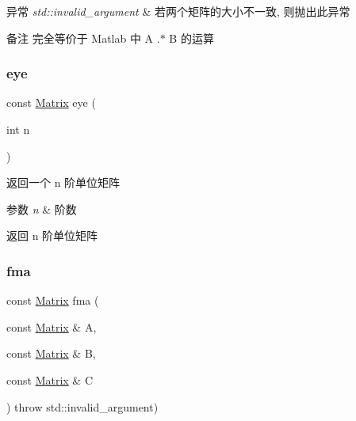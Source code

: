 \begin{DoxyExceptions}{异常}
{\em std\+::invalid\+\_\+argument} & 若两个矩阵的大小不一致, 则抛出此异常 \\
\hline
\end{DoxyExceptions}
\begin{DoxyRemark}{备注}
完全等价于 Matlab 中 A .$\ast$ B 的运算 
\end{DoxyRemark}
\mbox{\label{classkerbal_1_1math_1_1_matrix_a66d6a7eb6b57a6e5acb75ab8b4349471}} 
\subsubsection{\texorpdfstring{eye}{eye}}
{\footnotesize\ttfamily const \hyperlink{classkerbal_1_1math_1_1_matrix}{Matrix} eye (\begin{DoxyParamCaption}\item[{int}]{n }\end{DoxyParamCaption})\hspace{0.3cm}{\ttfamily [friend]}}



返回一个 n 阶单位矩阵 


\begin{DoxyParams}{参数}
{\em n} & 阶数 \\
\hline
\end{DoxyParams}
\begin{DoxyReturn}{返回}
n 阶单位矩阵 
\end{DoxyReturn}
\mbox{\label{classkerbal_1_1math_1_1_matrix_aef00278756b7155aa065aa0e2c206b91}} 
\subsubsection{\texorpdfstring{fma}{fma}}
{\footnotesize\ttfamily const \hyperlink{classkerbal_1_1math_1_1_matrix}{Matrix} fma (\begin{DoxyParamCaption}\item[{const \hyperlink{classkerbal_1_1math_1_1_matrix}{Matrix} \&}]{A,  }\item[{const \hyperlink{classkerbal_1_1math_1_1_matrix}{Matrix} \&}]{B,  }\item[{const \hyperlink{classkerbal_1_1math_1_1_matrix}{Matrix} \&}]{C }\end{DoxyParamCaption}) throw  std\+::invalid\+\_\+argument) \hspace{0.3cm}{\ttfamily [friend]}}



